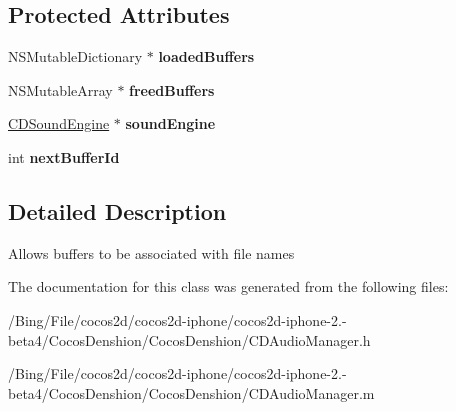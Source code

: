 \subsection*{Protected Attributes}
\begin{DoxyCompactItemize}
\item 
\hypertarget{interface_c_d_buffer_manager_ad9cce7c9937f4b11fae676ca010fc861}{N\-S\-Mutable\-Dictionary $\ast$ {\bfseries loaded\-Buffers}}\label{interface_c_d_buffer_manager_ad9cce7c9937f4b11fae676ca010fc861}

\item 
\hypertarget{interface_c_d_buffer_manager_aaf5303c52c286bad91b4eb8be5f5ac1f}{N\-S\-Mutable\-Array $\ast$ {\bfseries freed\-Buffers}}\label{interface_c_d_buffer_manager_aaf5303c52c286bad91b4eb8be5f5ac1f}

\item 
\hypertarget{interface_c_d_buffer_manager_a714a580d55b9d67f7c0f145ca42430a9}{\hyperlink{interface_c_d_sound_engine}{C\-D\-Sound\-Engine} $\ast$ {\bfseries sound\-Engine}}\label{interface_c_d_buffer_manager_a714a580d55b9d67f7c0f145ca42430a9}

\item 
\hypertarget{interface_c_d_buffer_manager_a092a00496df917e924a5b8399cf5aae5}{int {\bfseries next\-Buffer\-Id}}\label{interface_c_d_buffer_manager_a092a00496df917e924a5b8399cf5aae5}

\end{DoxyCompactItemize}


\subsection{Detailed Description}
Allows buffers to be associated with file names 

The documentation for this class was generated from the following files\-:\begin{DoxyCompactItemize}
\item 
/\-Bing/\-File/cocos2d/cocos2d-\/iphone/cocos2d-\/iphone-\/2.-\/beta4/\-Cocos\-Denshion/\-Cocos\-Denshion/C\-D\-Audio\-Manager.\-h\item 
/\-Bing/\-File/cocos2d/cocos2d-\/iphone/cocos2d-\/iphone-\/2.-\/beta4/\-Cocos\-Denshion/\-Cocos\-Denshion/C\-D\-Audio\-Manager.\-m\end{DoxyCompactItemize}
